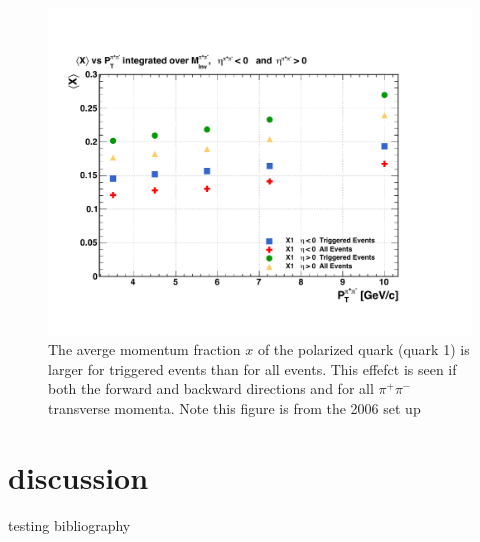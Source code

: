 \documentclass[abstract = on,listof=totoc, bibliography=totoc]{scrreprt}
\newcommand{\pip}{\pi^+}
\newcommand{\pim}{\pi^-}
\newcommand{\pair}{$\pip\pim$ }
\begin{document}
\begin{figure}
\begin{center}
\includegraphics[width = 1\textwidth]{TriggerBiasXHiQualColor}
\caption[Trigger bias toward higher momentum fraction $x$ events]{The averge momentum fraction $x$ of the polarized quark (quark 1) is larger for triggered events than for all events. This effefct is seen if both the forward and backward directions and for all \pair transverse momenta. Note this figure is from the 2006 set up}
\label{fig:TriggerBiasXHiQualColor}
\end{center}
\end{figure}


\chapter{discussion}


testing bibliography 
\cite{pythTunes}
\cite{IEP}
\cite{transIntroduced}
\cite{ppCollider}
\cite{hermesHel}
\cite{extractIFF}
\cite{belleIFF}
\cite{BEMC}
\cite{TPC}
\cite{magnet}
\cite{STARoverview}
\cite{RHICoverview}
\cite{compassRes}
\cite{hermesRes}
\cite{crossRatio}
\cite{bacchettaRadici2}
\cite{Tang}
\cite{TOFppVPD}
\cite{hardScatAmp}
\cite{PhysRevD.65.074031} %
\cite{1742-6596-295-1-012053} %
\cite{PhysRevD.74.114007} %
\cite{PhysRevD.67.094003}
\cite{PhysRevLett.80.1166}
\cite{PhysRevLett.106.172001}
\cite{Ralston1979109}
\cite{PhysRevD.62.034008}
\cite{PhysRevD.77.014035}
\cite{PhysRevD.79.034029}
\cite{2006Paper}
\cite{unpolDisFuncPic}
\cite{jaffeWhereSpinComeFrom}
\cite{factorization}
\cite{BacchettaThesis}

\printbibliography
%
%
%
%
\end{document}
